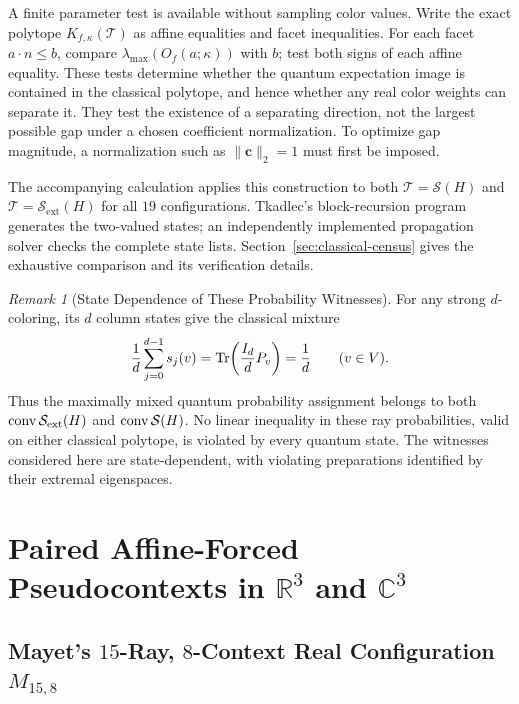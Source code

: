 \documentclass[aps,pra,reprint,superscriptaddress,longbibliography,nofootinbib,floatfix,10pt]{revtex4-2}
\theoremstyle{definition}\newtheorem{definition}[theorem]{Definition}
\theoremstyle{remark}\newtheorem{remark}[theorem]{Remark}
\newcommand{\C}{\mathbb C}\newcommand{\R}{\mathbb R}\newcommand{\Q}{\mathbb Q}
\newcommand{\Sc}{\mathcal S}\newcommand{\Cc}{\mathcal C}\newcommand{\Wc}{\mathcal W}
\begin{document}
A finite parameter test is available without sampling color values. Write the exact polytope $K_{f,\kappa}(\mathcal T)$ as affine equalities and facet inequalities. For each facet $a\cdot n\le b$, compare $\lambda_{\max}(O_f(a;\kappa))$ with $b$; test both signs of each affine equality. These tests determine whether the quantum expectation image is contained in the classical polytope, and hence whether any real color weights can separate it. They test the existence of a separating direction, not the largest possible gap under a chosen coefficient normalization. To optimize gap magnitude, a normalization such as $\|\mathbf c\|_2=1$ must first be imposed.

The accompanying calculation applies this construction to both $\mathcal T=\Sc(H)$ and $\mathcal T=\Sc_{\mathrm{ext}}(H)$ for all $19$ configurations. Tkadlec's block-recursion program~\cite{tkadlec-2states} generates the two-valued states; an independently implemented propagation solver checks the complete state lists. Section~\ref{sec:classical-census} gives the exhaustive comparison and its verification details.

\begin{remark}[State Dependence of These Probability Witnesses]\label{rem:state-dependent-witnesses}
For any strong $d$-coloring, its $d$ column states give the classical mixture
\begin{equation}\label{eq:classical-maximally-mixed-point}
\frac1d\sum_{j=0}^{d-1}s_j(v)
=\operatorname{Tr}\!\left(\frac{I_d}{d}P_v\right)=\frac1d
\qquad(v\in V).
\end{equation}
Thus the maximally mixed quantum probability assignment belongs to both $\conv\Sc_{\mathrm{ext}}(H)$ and $\conv\Sc(H)$. No linear inequality in these ray probabilities, valid on either classical polytope, is violated by every quantum state. The witnesses considered here are state-dependent, with violating preparations identified by their extremal eigenspaces.
\end{remark}

\section{Paired Affine-Forced Pseudocontexts in \texorpdfstring{$\R^3$ and $\C^3$}{R3 and C3}}\label{sec:paired-affine}

\subsection{Mayet's \texorpdfstring{$15$}{15}-Ray, \texorpdfstring{$8$}{8}-Context Real Configuration \texorpdfstring{$M_{15,8}$}{M15,8}}\label{sec:mayet}
\end{document}

